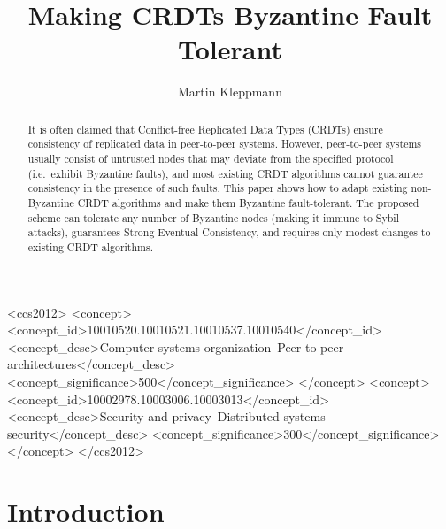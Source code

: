 \documentclass[sigplan,review]{acmart}
\begin{document}
\title{Making CRDTs Byzantine Fault Tolerant}
\author{Martin Kleppmann}

\begin{abstract}
It is often claimed that Conflict-free Replicated Data Types (CRDTs) ensure consistency of replicated data in peer-to-peer systems.
However, peer-to-peer systems usually consist of untrusted nodes that may deviate from the specified protocol (i.e.\ exhibit Byzantine faults), and most existing CRDT algorithms cannot guarantee consistency in the presence of such faults.
This paper shows how to adapt existing non-Byzantine CRDT algorithms and make them Byzantine fault-tolerant.
The proposed scheme can tolerate any number of Byzantine nodes (making it immune to Sybil attacks), guarantees Strong Eventual Consistency, and requires only modest changes to existing CRDT algorithms.
\end{abstract}

\begin{CCSXML}
<ccs2012>
    <concept>
        <concept_id>10010520.10010521.10010537.10010540</concept_id>
        <concept_desc>Computer systems organization~Peer-to-peer architectures</concept_desc>
        <concept_significance>500</concept_significance>
    </concept>
    <concept>
        <concept_id>10002978.10003006.10003013</concept_id>
        <concept_desc>Security and privacy~Distributed systems security</concept_desc>
        <concept_significance>300</concept_significance>
    </concept>
</ccs2012>
\end{CCSXML}


\maketitle

\section{Introduction}\label{sec:introduction}
\end{document}
